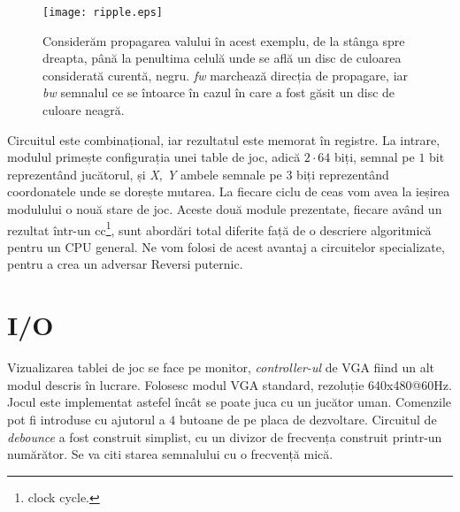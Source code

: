 \documentclass[11pt,twocolumn,a4paper]{article}
\begin{document}
\begin{figure}[h]
\texttt{[image: ripple.eps]}
\caption{\small{Considerăm propagarea valului în acest exemplu, de la stânga spre dreapta, până la penultima celulă unde se află un disc de culoarea considerată curentă, negru. \emph{fw} marchează direcția de propagare, iar \emph{bw} semnalul ce se întoarce în cazul în care a fost găsit un disc de culoare neagră.}}
\label{fig:fig_ripple}
\end{figure}

Circuitul este combinațional, iar rezultatul este memorat în registre. La intrare, modulul primește configurația unei table de joc, adică $2 \cdot 64$ biți, semnal pe $1$ bit reprezentând jucătorul, și \emph{X, Y} ambele semnale pe $3$ biți reprezentând coordonatele unde se dorește mutarea. La fiecare ciclu de ceas vom avea la ieșirea modulului o nouă stare de joc. Aceste două module prezentate, fiecare având un rezultat într-un cc\footnote{clock cycle.}, sunt abordări total diferite față de o descriere algoritmică pentru un CPU general. Ne vom folosi de acest avantaj a circuitelor specializate, pentru a crea un adversar Reversi puternic.
\section*{I/O}
Vizualizarea tablei de joc se face pe monitor, \emph{controller-ul} de VGA fiind un alt modul descris în lucrare. Folosesc modul VGA standard, rezoluție 640x480@60Hz. Jocul este implementat astefel încât se poate juca cu un jucător uman. Comenzile pot fi introduse cu ajutorul a $4$ butoane de pe placa de dezvoltare. Circuitul de \emph{debounce} a fost construit simplist, cu un divizor de frecvența construit printr-un numărător. Se va citi starea semnalului cu o frecvență mică.
\end{document}
